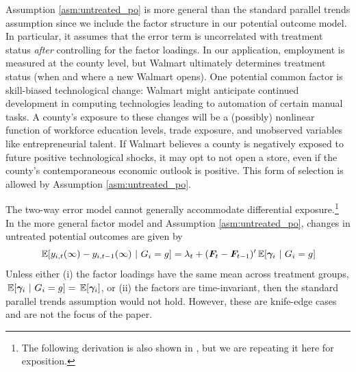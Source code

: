 \documentclass[12pt]{article}
\begin{document}
Assumption \ref{asm:untreated_po} is more general than the standard parallel trends assumption since we include the factor structure in our potential outcome model. 
In particular, it assumes that the error term is uncorrelated with treatment status \emph{after} controlling for the factor loadings. In our application, employment is measured at the county level, but Walmart ultimately determines treatment status (when and where a new Walmart opens). 
One potential common factor is skill-biased technological change: Walmart might anticipate continued development in computing technologies leading to automation of certain manual tasks. 
A county's exposure to these changes will be a (possibly) nonlinear function of workforce education levels, trade exposure, and unobserved variables like entrepreneurial talent. 
If Walmart believes a county is negatively exposed to future positive technological shocks, it may opt to not open a store, even if the county's contemporaneous economic outlook is positive. 
This form of selection is allowed by Assumption \ref{asm:untreated_po}.

The two-way error model cannot generally accommodate differential exposure.\footnote{The following derivation is also shown in \citet{Callaway_Karami_2020}, but we are repeating it here for exposition.} In the more general factor model and Assumption \ref{asm:untreated_po}, changes in untreated potential outcomes are given by
\begin{equation*}
  \expec{y_{i,t}(\infty) - y_{i,t-1}(\infty)}{G_i = g} = \lambda_t + (\bm{F}_t - \bm{F}_{t-1})' \expec{\bm \gamma_i}{G_i = g}
\end{equation*}
Unless either (i) the factor loadings have the same mean across treatment groups, $\expec{\bm \gamma_i}{G_i = g} = \expec{\bm \gamma_i}$, or (ii) the factors are time-invariant, then the standard parallel trends assumption would not hold. However, these are knife-edge cases and are not the focus of the paper. 

\end{document}
